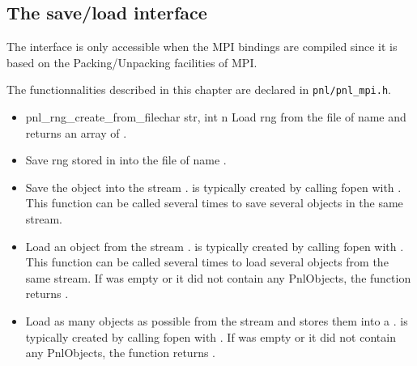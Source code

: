 \subsection{The save/load interface}

The interface is only accessible when the MPI bindings are compiled since it
is based on the Packing/Unpacking facilities of MPI.

The functionnalities described in this chapter are declared in \verb!pnl/pnl_mpi.h!.
\begin{itemize}
\item {}
  {pnl_rng_create_from_file}{char \ptr str, int n}
  \sshortdescribe Load  rng from the file of name  and
  returns an array of  .
\item {}
    \sshortdescribe Save  rng stored in  into the file of
  name .
\item {}
  \sshortdescribe Save the object  into the stream . 
  is typically created by calling fopen with . This function can be
  called several times to save several objects in the same stream.
\item {}
  \sshortdescribe Load an object from the stream . 
  is typically created by calling fopen with .  This function can be
  called several times to load several objects from the same stream. If 
  was empty or it did not contain any PnlObjects, the function returns .
\item {}
  \sshortdescribe Load as many objects as possible from the stream  and
  stores them into a .  is typically created by
  calling fopen with . If  was empty or it did not contain
  any PnlObjects, the function returns .
\end{itemize}


